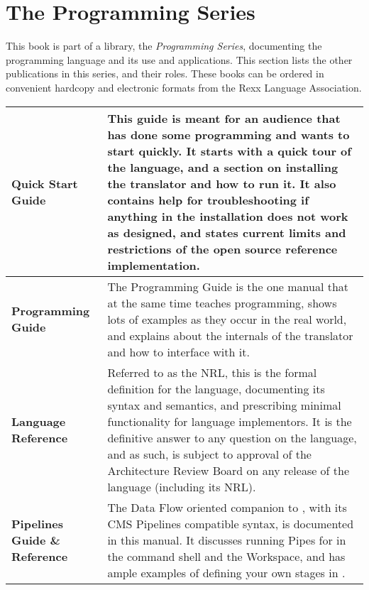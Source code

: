 \chapter{The \nr{} Programming Series}
This book is part of a library, the \emph{\nr{} Programming Series}, documenting the \nr{} programming language and its use and applications. This section lists the other publications in this series, and their roles. These books can be ordered in convenient hardcopy and electronic formats from the Rexx Language Association.
\newline
\begin{tabularx}{\textwidth}{>{\bfseries}lX}
\toprule
Quick Start Guide & This guide is meant for an audience that has done some programming and wants to start quickly. It starts with a quick tour of the language, and a section on installing the \nr{} translator and how to run it. It also contains help for troubleshooting if anything in the installation does not work as designed, and states current limits and restrictions of the open source reference implementation.
\\\midrule
Programming Guide & The Programming Guide is the one manual that at the same time teaches programming, shows lots of examples as they occur in the real world, and explains about the internals of the translator and how to interface with it.
\\\midrule
Language Reference & Referred to as the NRL, this is the formal definition for the language, documenting its syntax and semantics, and prescribing minimal functionality for language implementors. It is the definitive answer to any question on the language, and as such, is subject to approval of the \nr{} Architecture Review Board on any release of the language (including its NRL).
\\\midrule
Pipelines Guide \& Reference & The Data Flow oriented companion to \nr{}, with its CMS Pipelines compatible syntax, is documented in this manual. It discusses running Pipes for \nr{} in the command shell and the Workspace, and has ample examples of defining your own stages in \nr{}.
\\\bottomrule
\end{tabularx}
